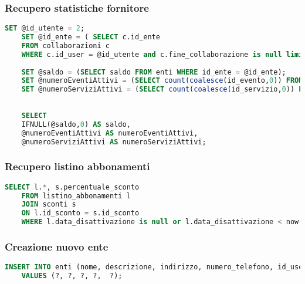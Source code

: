 \subsubsection{Recupero statistiche fornitore}
\begin{lstlisting}[language=SQL]
	SET @id_utente = 2;
	SET @id_ente = ( SELECT c.id_ente
	FROM collaborazioni c
	WHERE c.id_user = @id_utente and c.fine_collaborazione is null limit 1);
	
	SET @saldo = (SELECT saldo FROM enti WHERE id_ente = @id_ente);
	SET @numeroEventiAttivi = (SELECT count(coalesce(id_evento,0)) FROM eventi WHERE fine_validita > now() and id_ente = @id_ente);
	SET @numeroServiziAttivi = (SELECT count(coalesce(id_servizio,0)) FROM servizi WHERE fine_validita > now() and id_ente = @id_ente);
	
	
	SELECT  
	IFNULL(@saldo,0) AS saldo,
	@numeroEventiAttivi AS numeroEventiAttivi,
	@numeroServiziAttivi AS numeroServiziAttivi;
\end{lstlisting}




\subsubsection{Recupero listino abbonamenti}
\begin{lstlisting}[language=SQL]
	SELECT l.*, s.percentuale_sconto
	FROM listino_abbonamenti l
	JOIN sconti s
	ON l.id_sconto = s.id_sconto
	WHERE l.data_disattivazione is null or l.data_disattivazione < now();
\end{lstlisting}


\subsubsection{Creazione nuovo ente}
\begin{lstlisting}[language=SQL]
	INSERT INTO enti (nome, descrizione, indirizzo, numero_telefono, id_user) 
	VALUES (?, ?, ?, ?,  ?);
\end{lstlisting}









